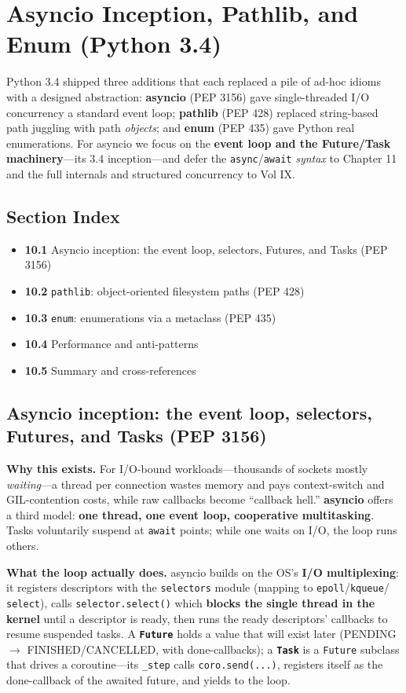 \chapter{Asyncio Inception, Pathlib, and Enum (Python 3.4)}

Python 3.4 shipped three additions that each replaced a pile of ad-hoc idioms with a designed
abstraction: \textbf{asyncio} (PEP 3156) gave single-threaded I/O concurrency a standard event
loop; \textbf{pathlib} (PEP 428) replaced string-based path juggling with path \emph{objects};
and \textbf{enum} (PEP 435) gave Python real enumerations. For asyncio we focus on the
\textbf{event loop and the Future/Task machinery}---its 3.4 inception---and defer the
\texttt{async}/\texttt{await} \emph{syntax} to Chapter 11 and the full internals and structured
concurrency to Vol IX.

\section*{Section Index}
\begin{itemize}
  \item \textbf{10.1} Asyncio inception: the event loop, selectors, Futures, and Tasks (PEP 3156)
  \item \textbf{10.2} \texttt{pathlib}: object-oriented filesystem paths (PEP 428)
  \item \textbf{10.3} \texttt{enum}: enumerations via a metaclass (PEP 435)
  \item \textbf{10.4} Performance and anti-patterns
  \item \textbf{10.5} Summary and cross-references
\end{itemize}

\section{Asyncio inception: the event loop, selectors, Futures, and Tasks (PEP 3156)}

\textbf{Why this exists.} For I/O-bound workloads---thousands of sockets mostly \emph{waiting}---a
thread per connection wastes memory and pays context-switch and GIL-contention costs, while raw
callbacks become ``callback hell.'' \textbf{asyncio} offers a third model: \textbf{one thread, one
event loop, cooperative multitasking}. Tasks voluntarily suspend at \texttt{await} points; while
one waits on I/O, the loop runs others.

\textbf{What the loop actually does.} asyncio builds on the OS's \textbf{I/O multiplexing}: it
registers descriptors with the \texttt{selectors} module (mapping to \texttt{epoll}/\texttt{kqueue}/
\texttt{select}), calls \texttt{selector.select()} which \textbf{blocks the single thread in the
kernel} until a descriptor is ready, then runs the ready descriptors' callbacks to resume suspended
tasks. A \textbf{\texttt{Future}} holds a value that will exist later (PENDING $\to$
FINISHED/CANCELLED, with done-callbacks); a \textbf{\texttt{Task}} is a \texttt{Future} subclass
that drives a coroutine---its \texttt{\_step} calls \texttt{coro.send(...)}, registers itself as the
done-callback of the awaited future, and yields to the loop.

